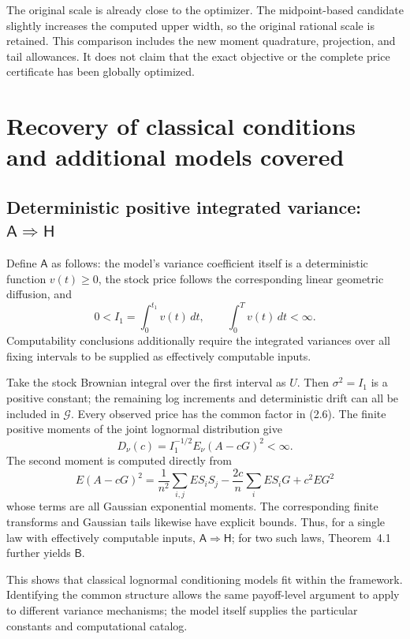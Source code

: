 \documentclass[11pt,a4paper]{article}
\begin{document}
The original scale is already close to the optimizer. The midpoint-based
candidate slightly increases the computed upper width, so the original rational
scale is retained. This comparison includes the new moment quadrature, projection,
and tail allowances. It does not claim that the exact objective or the complete price
certificate has been globally optimized.


\section{Recovery of classical conditions and additional models covered}

\subsection{Deterministic positive integrated variance: \(\mathsf A\Rightarrow\mathsf H\)}

Define \(\mathsf A\) as follows: the model's variance coefficient itself is a deterministic function \(v(t)\ge0\), the stock price follows the corresponding linear geometric diffusion, and
\[
0<I_1=\int_0^{t_1}v(t)\,dt,\qquad \int_0^T v(t)\,dt<\infty.
\tag{5.1}
\]
Computability conclusions additionally require the integrated variances over all fixing intervals to be supplied as effectively computable inputs.

Take the stock Brownian integral over the first interval as \(U\). Then \(\sigma^2=I_1\) is a positive constant; the remaining log increments and deterministic drift can all be included in \(\mathcal G\). Every observed price has the common factor in (2.6). The finite positive moments of the joint lognormal distribution give
\[
D_\nu(c)=I_1^{-1/2}E_\nu(A-cG)^2<\infty.
\]
The second moment is computed directly from
\[
E(A-cG)^2=\frac1{n^2}\sum_{i,j}ES_iS_j
-\frac{2c}{n}\sum_iES_iG+c^2EG^2
\tag{5.2}
\]
whose terms are all Gaussian exponential moments. The corresponding finite transforms and Gaussian tails likewise have explicit bounds. Thus, for a single law with effectively computable inputs, \(\mathsf A\Rightarrow\mathsf H\); for two such laws, Theorem~4.1 further yields \(\mathsf B\).

This shows that classical lognormal conditioning models fit within the framework. Identifying the common structure allows the same payoff-level argument to apply to different variance mechanisms; the model itself supplies the particular constants and computational catalog.
\end{document}
